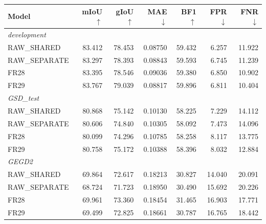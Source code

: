 \par\medskip\noindent\begin{minipage}{\linewidth}
\centering\small\setlength{\tabcolsep}{3pt}
\label{tab:factorial}
\begin{tabular}{lrrrrrr}
\toprule
Model & mIoU$\uparrow$ & gIoU$\uparrow$ & MAE$\downarrow$ & BF1$\uparrow$ & FPR$\downarrow$ & FNR$\downarrow$\\\midrule

\multicolumn{7}{l}{\textit{development}}\\
RAW\_SHARED & 83.412 & 78.453 & 0.08750 & 59.432 & 6.257 & 11.922\\
RAW\_SEPARATE & 83.297 & 78.393 & 0.08843 & 59.593 & 6.745 & 11.239\\
FR28 & 83.395 & 78.546 & 0.09036 & 59.380 & 6.850 & 10.902\\
FR29 & 83.767 & 79.039 & 0.08817 & 59.896 & 6.811 & 10.404\\
\multicolumn{7}{l}{\textit{GSD\_test}}\\
RAW\_SHARED & 80.868 & 75.142 & 0.10130 & 58.225 & 7.229 & 14.112\\
RAW\_SEPARATE & 80.606 & 74.840 & 0.10305 & 58.092 & 7.473 & 14.096\\
FR28 & 80.099 & 74.296 & 0.10785 & 58.258 & 8.117 & 13.775\\
FR29 & 80.758 & 75.172 & 0.10388 & 58.396 & 8.032 & 12.884\\
\multicolumn{7}{l}{\textit{GEGD2}}\\
RAW\_SHARED & 69.864 & 72.617 & 0.18213 & 30.827 & 14.040 & 20.091\\
RAW\_SEPARATE & 68.724 & 71.723 & 0.18950 & 30.490 & 15.692 & 20.226\\
FR28 & 69.961 & 73.360 & 0.18454 & 31.465 & 16.903 & 17.771\\
FR29 & 69.499 & 72.825 & 0.18661 & 30.787 & 16.765 & 18.442\\
\bottomrule
\end{tabular}
\end{minipage}\par\medskip
